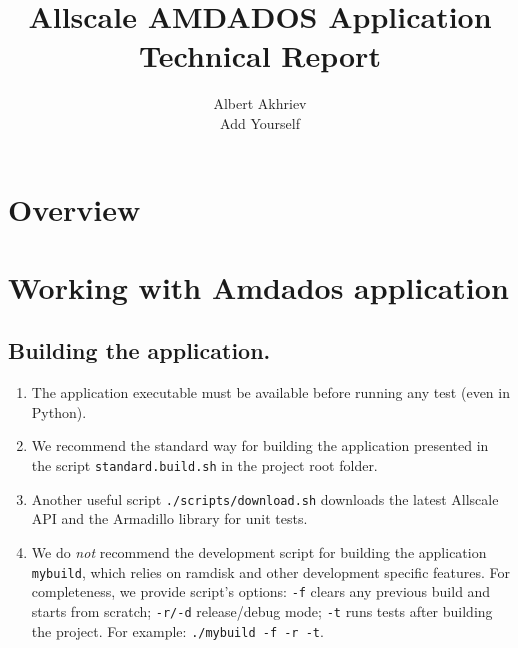 \documentclass[]{article}
\title{Allscale AMDADOS Application \\ Technical Report}
\author{Albert Akhriev \\ Add Yourself}
\begin{document}
\maketitle

\tableofcontents
\newpage

\section{Overview}



\section{Working with Amdados application}

\subsection{Building the application.}
\begin{enumerate}
\item The application executable must be available before running any test (even in Python).
\item We recommend the standard way for building the application presented in the script \texttt{standard.build.sh} in the project root folder.
\item Another useful script \texttt{./scripts/download.sh} downloads the latest \linebreak Allscale API and the Armadillo library for unit tests.
\item We do \textit{not} recommend the development script for building the application \texttt{mybuild}, which relies on ramdisk and other development specific features. For completeness, we provide script's options: \texttt{-f} clears any previous build and starts from scratch; \texttt{-r/-d} release/debug mode; \texttt{-t} runs tests after building the project. For example: \texttt{./mybuild -f -r -t}.
\end{enumerate}

\end{document}
